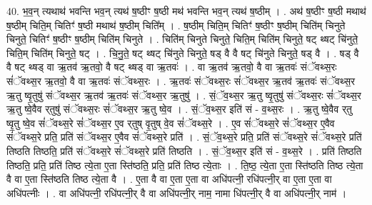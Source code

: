\documentclass[17pt]{extarticle}
\begin{document}
40. भ॒व॒न् त्यथाथ॑ भवन्ति भव॒न् त्यथ॑ ष॒ष्ठीꣳ ष॒ष्ठी मथ॑ भवन्ति भव॒न् त्यथ॑ ष॒ष्ठीम् । . अथ॑ ष॒ष्ठीꣳ ष॒ष्ठी मथाथ॑ ष॒ष्ठीम् चिति॒म् चितिꣳ॑ ष॒ष्ठी मथाथ॑ ष॒ष्ठीम् चिति᳚म् । . ष॒ष्ठीम् चिति॒म् चितिꣳ॑ ष॒ष्ठीꣳ ष॒ष्ठीम् चिति॑म् चिनुते चिनुते॒ चितिꣳ॑ ष॒ष्ठीꣳ ष॒ष्ठीम् चिति॑म् चिनुते । . चिति॑म् चिनुते चिनुते॒ चिति॒म् चिति॑म् चिनुते॒ षट् थ्षट् चि॑नुते॒ चिति॒म् चिति॑म् चिनुते॒ षट् । . चि॒नु॒ते॒ षट् थ्षट् चि॑नुते चिनुते॒ षड् वै वै षट् चि॑नुते चिनुते॒ षड् वै । . षड् वै वै षट् थ्षड् वा ऋ॒तव॑ ऋ॒तवो॒ वै षट् थ्षड् वा ऋ॒तवः॑ । . वा ऋ॒तव॑ ऋ॒तवो॒ वै वा ऋ॒तवः॑ संॅवथ्स॒रः सं॑ॅवथ्स॒र ऋ॒तवो॒ वै वा ऋ॒तवः॑ संॅवथ्स॒रः । . ऋ॒तवः॑ संॅवथ्स॒रः सं॑ॅवथ्स॒र ऋ॒तव॑ ऋ॒तवः॑ संॅवथ्स॒र ऋ॒तु ष्वृ॒तुषु॑ संॅवथ्स॒र ऋ॒तव॑ ऋ॒तवः॑ संॅवथ्स॒र ऋ॒तुषु॑ । . सं॒ॅव॒थ्स॒र ऋ॒तु ष्वृ॒तुषु॑ संॅवथ्स॒रः सं॑ॅवथ्स॒र ऋ॒तु ष्वे॒वैव र्‌तुषु॑ संॅवथ्स॒रः सं॑ॅवथ्स॒र ऋ॒तु ष्वे॒व । . सं॒ॅव॒थ्स॒र इति॑ सं - व॒थ्स॒रः । . ऋ॒तु ष्वे॒वैव र्‌तु ष्वृ॒तु ष्वे॒व सं॑ॅवथ्स॒रे सं॑ॅवथ्स॒र ए॒व र्‌तुष् वृ॒तुष् वे॒व सं॑ॅवथ्स॒रे । . ए॒व सं॑ॅवथ्स॒रे सं॑ॅवथ्स॒र ए॒वैव सं॑ॅवथ्स॒रे प्रति॒ प्रति॑ संॅवथ्स॒र ए॒वैव सं॑ॅवथ्स॒रे प्रति॑ । . सं॒ॅव॒थ्स॒रे प्रति॒ प्रति॑ संॅवथ्स॒रे सं॑ॅवथ्स॒रे प्रति॑ तिष्ठति तिष्ठति॒ प्रति॑ संॅवथ्स॒रे सं॑ॅवथ्स॒रे प्रति॑ तिष्ठति । . सं॒ॅव॒थ्स॒र इति॑ सं - व॒थ्स॒रे । . प्रति॑ तिष्ठति तिष्ठति॒ प्रति॒ प्रति॑ तिष्ठ त्ये॒ता ए॒ता स्ति॑ष्ठति॒ प्रति॒ प्रति॑ तिष्ठ त्ये॒ताः । . ति॒ष्ठ॒ त्ये॒ता ए॒ता स्ति॑ष्ठति तिष्ठ त्ये॒ता वै वा ए॒ता स्ति॑ष्ठति तिष्ठ त्ये॒ता वै । . ए॒ता वै वा ए॒ता ए॒ता वा अधि॑पत्नी॒ रधि॑पत्नी॒र् वा ए॒ता ए॒ता वा अधि॑पत्नीः । . वा अधि॑पत्नी॒ रधि॑पत्नी॒र् वै वा अधि॑पत्नी॒र् नाम॒ नामा धि॑पत्नी॒र् वै वा अधि॑पत्नी॒र् नाम॑ । \newline
\pagebreak
{}
\end{document}
